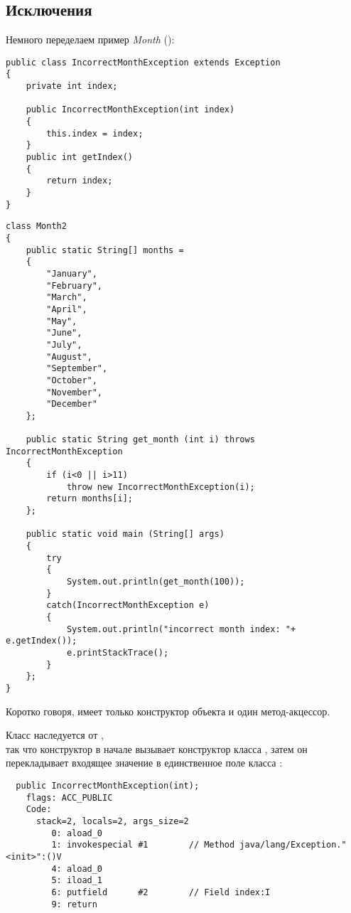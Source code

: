 \subsection{Исключения}

Немного переделаем пример \emph{Month} ():

\begin{lstlisting}[caption=IncorrectMonthException.java,style=customjava]
public class IncorrectMonthException extends Exception
{
	private int index;

	public IncorrectMonthException(int index)
	{
		this.index = index;
	} 
	public int getIndex()
	{
		return index;
	}
}
\end{lstlisting}

\begin{lstlisting}[caption=Month2.java,style=customjava]
class Month2
{
	public static String[] months = 
	{
		"January", 
		"February", 
		"March", 
		"April",
		"May",
		"June",
		"July",
		"August",
		"September",
		"October",
		"November",
		"December"
	};

	public static String get_month (int i) throws IncorrectMonthException
	{
		if (i<0 || i>11)
			throw new IncorrectMonthException(i);
		return months[i];
	};

	public static void main (String[] args)
	{
		try
		{
			System.out.println(get_month(100));
		}
		catch(IncorrectMonthException e)
		{
			System.out.println("incorrect month index: "+ e.getIndex());
			e.printStackTrace();
		}
	};
}
\end{lstlisting}

Коротко говоря,  имеет только конструктор объекта и один
метод-акцессор.

Класс  наследуется от , \\
так что конструктор 
в начале вызывает конструктор класса , 
затем он перекладывает входящее значение в единственное поле класса :

\begin{lstlisting}
  public IncorrectMonthException(int);
    flags: ACC_PUBLIC
    Code:
      stack=2, locals=2, args_size=2
         0: aload_0       
         1: invokespecial #1        // Method java/lang/Exception."<init>":()V
         4: aload_0       
         5: iload_1       
         6: putfield      #2        // Field index:I
         9: return        
\end{lstlisting}

